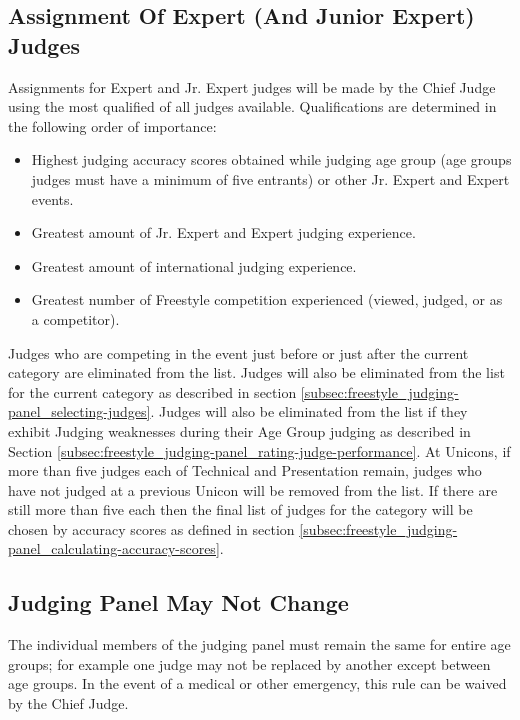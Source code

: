 \subsection{Assignment Of Expert (And Junior Expert) Judges \label{subsec:freestyle_judging-panel_assignment-of-expert-judges}}
Assignments for Expert and Jr. Expert judges will be made by the Chief Judge using the most qualified of all judges available.
Qualifications are determined in the following order of importance: 
\begin{itemize}
\item Highest judging accuracy scores obtained while judging age group (age groups judges must have a minimum of five entrants) or other Jr. Expert and Expert events.
\item Greatest amount of Jr. Expert and Expert judging experience.
\item Greatest amount of international judging experience.
\item Greatest number of Freestyle competition experienced (viewed, judged, or as a competitor).
\end{itemize}
Judges who are competing in the event just before or just after the current category are eliminated from the list.
Judges will also be eliminated from the list for the current category as described in section \ref{subsec:freestyle_judging-panel_selecting-judges}.
Judges will also be eliminated from the list if they exhibit Judging weaknesses during their Age Group judging as described in Section \ref{subsec:freestyle_judging-panel_rating-judge-performance}.
At Unicons, if more than five judges each of Technical and Presentation remain, judges who have not judged at a previous Unicon will be removed from the list.
If there are still more than five each then the final list of judges for the category will be chosen by accuracy scores as defined in section \ref{subsec:freestyle_judging-panel_calculating-accuracy-scores}.

\subsection{Judging Panel May Not Change}
The individual members of the judging panel must remain the same for entire age groups; for example one judge may not be replaced by another except between age groups.
In the event of a medical or other emergency, this rule can be waived by the Chief Judge.


